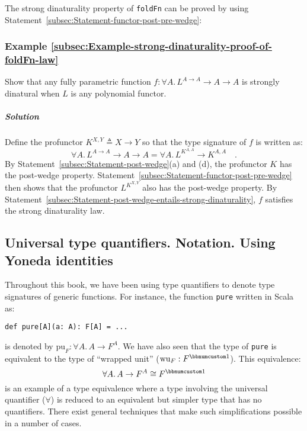 The strong dinaturality property of \lstinline!foldFn! can be proved
by using Statement~\ref{subsec:Statement-functor-post-pre-wedge}:

\subsubsection{Example \label{subsec:Example-strong-dinaturality-proof-of-foldFn-law}\ref{subsec:Example-strong-dinaturality-proof-of-foldFn-law}}

Show that any fully parametric function $f:\forall A.\,L^{A\rightarrow A}\rightarrow A\rightarrow A$
is strongly dinatural when $L$ is any polynomial functor.

\subparagraph{Solution}

Define the profunctor $K^{X,Y}\triangleq X\rightarrow Y$ so that
the type signature of $f$ is written as:
\[
\forall A.\,L^{A\rightarrow A}\rightarrow A\rightarrow A=\forall A.\,L^{K^{A,A}}\rightarrow K^{A,A}\quad.
\]
By Statement~\ref{subsec:Statement-post-wedge}(a) and (d), the profunctor
$K$ has the post-wedge property. Statement~\ref{subsec:Statement-functor-post-pre-wedge}
then shows that the profunctor $L^{K^{X,Y}}$ also has the post-wedge
property. By Statement~\ref{subsec:Statement-post-wedge-entails-strong-dinaturality},
$f$ satisfies the strong dinaturality law. 

\subsection{Universal type quantifiers. Notation. Using Yoneda identities}

Throughout this book, we have been using type quantifiers to denote
type signatures of generic functions. For instance, the function \lstinline!pure!
written in Scala as:
\begin{lstlisting}
def pure[A](a: A): F[A] = ...
\end{lstlisting}
is denoted by $\text{pu}_{F}:\forall A.\,A\rightarrow F^{A}$. We
have also seen that the type of \lstinline!pure! is equivalent to
the type of \textsf{``}wrapped unit\textsf{''} ($\text{wu}_{F}:F^{\bbnum 1}$). This
equivalence:
\[
\forall A.\,A\rightarrow F^{A}\cong F^{\bbnum 1}
\]
is an example of a type equivalence where a type involving the universal
quantifier ($\forall$) is reduced to an equivalent but simpler type
that has no quantifiers. There exist general techniques that make
such simplifications possible in a number of cases.

